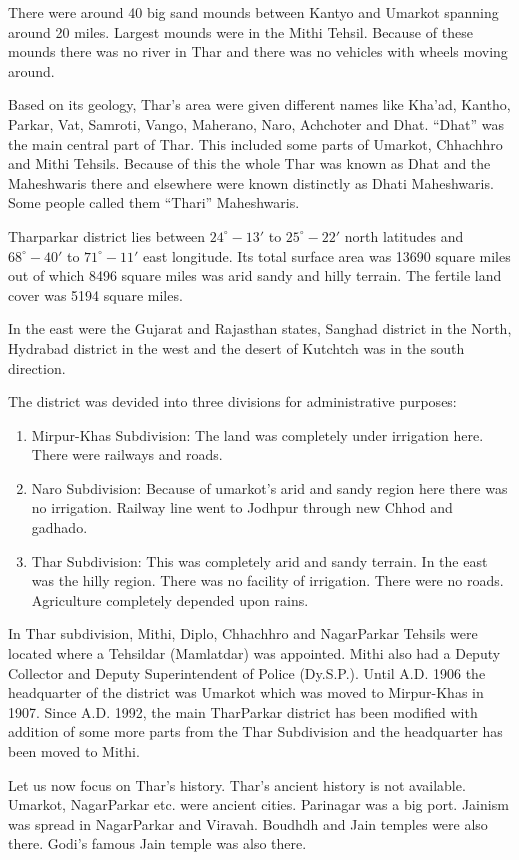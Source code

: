 There were around 40 big sand mounds between Kantyo and Umarkot spanning around 20 miles. Largest mounds were in the Mithi Tehsil. Because of these mounds there was no river in Thar and there was no vehicles with wheels moving around.

Based on its geology, Thar's area were given different names like Kha'ad, Kantho, Parkar, Vat, Samroti, Vango, Maherano, Naro, Achchoter and Dhat. ``Dhat'' was the main central part of Thar. This included some parts of Umarkot, Chhachhro and Mithi Tehsils. Because of this the whole Thar was known as Dhat and the Maheshwaris there and elsewhere were known distinctly as Dhati Maheshwaris. Some people called them ``Thari'' Maheshwaris.

Tharparkar district lies between $24^\circ-13'$ to $25^\circ-22'$ north latitudes and $68^\circ-40'$ to $71^\circ-11'$ east longitude. Its total surface area was 13690 square miles out of which 8496 square miles was arid sandy and hilly terrain. The fertile land cover was 5194 square miles.

In the east were the Gujarat and Rajasthan states, Sanghad district in the North, Hydrabad district in the west and the desert of Kutchtch was in the south direction.

The district was devided into three divisions for administrative purposes:
\begin{enumerate}
\item Mirpur-Khas Subdivision: The land was completely under irrigation here. There were railways and roads.
\item Naro Subdivision: Because of umarkot's arid and sandy region here there was no irrigation. Railway line went to Jodhpur through new Chhod and gadhado.
\item Thar Subdivision: This was completely arid and sandy terrain. In the east was the hilly region. There was no facility of irrigation. There were no roads. Agriculture completely depended upon rains.
\end{enumerate}
In Thar subdivision, Mithi, Diplo, Chhachhro and NagarParkar Tehsils were located where a Tehsildar (Mamlatdar) was appointed. Mithi also had a Deputy Collector and Deputy Superintendent of Police (Dy.S.P.). Until A.D. 1906 the headquarter of the district was Umarkot which was moved to Mirpur-Khas in 1907. Since A.D. 1992, the main TharParkar district has been modified with addition of some more parts from the Thar Subdivision and the headquarter has been moved to Mithi.

Let us now focus on Thar's history. Thar's ancient history is not available. Umarkot, NagarParkar etc. were ancient cities. Parinagar was a big port. Jainism was spread in NagarParkar and Viravah. Boudhdh and Jain temples were also there. Godi's famous Jain temple was also there.

